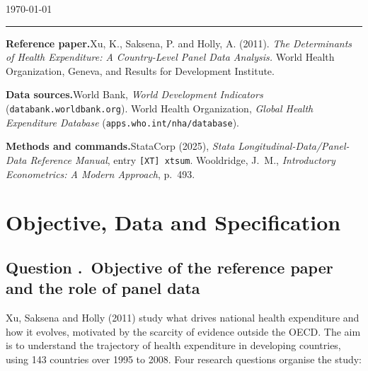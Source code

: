 \documentclass[11pt,a4paper]{article}
\newcounter{qnum}
\newcommand{\question}[1]{\subsection*{Question \stepcounter{qnum}\theqnum.\ #1}}
\begin{document}
\begin{titlepage}
\vspace{2.4em}
{\large\today\par}

\vspace*{\fill}

\rule{\textwidth}{0.4pt}
\vspace{0.5em}

\begin{minipage}{\textwidth}
\footnotesize\raggedright

\textbf{Reference paper.}\enspace Xu, K., Saksena, P. and Holly, A. (2011).
\textit{The Determinants of Health Expenditure: A Country-Level Panel Data
Analysis.} World Health Organization, Geneva, and Results for Development
Institute.

\vspace{0.7em}
\textbf{Data sources.}\enspace World Bank, \textit{World Development
Indicators} (\texttt{databank.worldbank.org}). World Health Organization,
\textit{Global Health Expenditure Database} (\texttt{apps.who.int/nha/database}).

\vspace{0.7em}
\textbf{Methods and commands.}\enspace StataCorp (2025), \textit{Stata
Longitudinal-Data/Panel-Data Reference Manual}, entry \texttt{[XT] xtsum}.
Wooldridge, J.~M., \textit{Introductory Econometrics: A Modern Approach},
p.~493.

\end{minipage}

\vspace{0.2in}
\end{titlepage}

\setcounter{page}{2}

\section{Objective, Data and Specification}

\question{Objective of the reference paper and the role of panel data}

Xu, Saksena and Holly (2011) study what drives national health expenditure and
how it evolves, motivated by the scarcity of evidence outside the OECD. The aim
is to understand the trajectory of health expenditure in developing countries,
using 143 countries over 1995 to 2008. Four research questions organise the
study:
\end{document}

